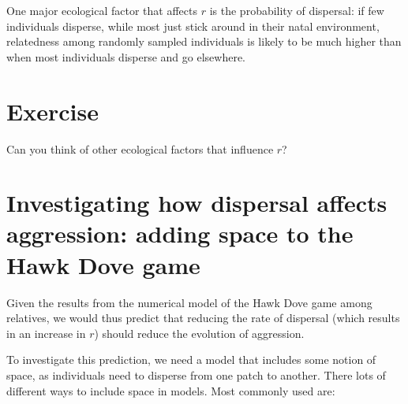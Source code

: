 \documentclass[
]{book}
\begin{document}
One major ecological factor that affects \(r\) is the probability of dispersal: if few individuals disperse, while most just stick around in their natal environment, relatedness among randomly sampled individuals is likely to be much higher than when most individuals disperse and go elsewhere.

\hypertarget{exercise-6}{%
\section{Exercise}\label{exercise-6}}

Can you think of other ecological factors that influence \(r\)?

\hypertarget{investigating-how-dispersal-affects-aggression-adding-space-to-the-hawk-dove-game}{%
\section{Investigating how dispersal affects aggression: adding space to the Hawk Dove game}\label{investigating-how-dispersal-affects-aggression-adding-space-to-the-hawk-dove-game}}

Given the results from the numerical model of the Hawk Dove game among relatives, we would thus predict that reducing the rate of dispersal (which results in an increase in \(r\)) should reduce the evolution of aggression.

To investigate this prediction, we need a model that includes some notion of space, as individuals need to disperse from one patch to another. There lots of different ways to include space in models. Most commonly used are:
\end{document}
